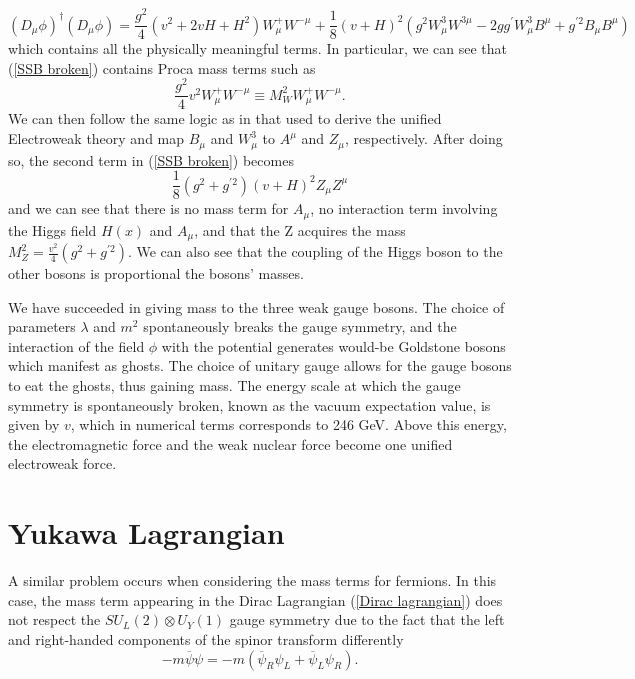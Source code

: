 \documentclass[10pt,a4paper]{book}
\begin{document}
\begin{equation}
\label{SSB broken}
(D_\mu\phi)^\dagger(D_\mu\phi) = \frac{g^2}{4}\left(v^2 + 2vH + H^2\right)W^+_\mu W^{- \mu} + \frac{1}{8}(v + H)^2 \left( g^2 W^3_\mu W^{3\mu} - 2gg^\prime W^3_\mu B^\mu + g^{\prime 2}B_\mu B^\mu \right)
\end{equation}
which contains all the physically meaningful terms. In particular, we can see that (\ref{SSB broken}) contains Proca mass terms such as 
\begin{equation}
\frac{g^2}{4}v^2 W_\mu^+ W^{-\mu} \equiv M^2_W W_\mu^+ W^{-\mu}.
\end{equation}
We can then follow the same logic as in that used to derive the unified Electroweak theory and map $B_\mu$ and $W^3_\mu$ to $A^\mu$ and $Z_\mu$, respectively. After doing so, the second term in (\ref{SSB broken}) becomes
\begin{equation}
\frac{1}{8}(g^2 + g^{\prime 2})(v + H)^2 Z_\mu Z^\mu
\end{equation}
and we can see that there is no mass term for $A_\mu$, no interaction term involving the Higgs field $H(x)$ and $A_\mu$, and that the Z acquires the mass $M^2_Z = \frac{v^2}{4}(g^2 + g^{\prime 2})$. We can also see that the coupling of the Higgs boson to the other bosons is proportional the bosons' masses. 

We have succeeded in giving mass to the three weak gauge bosons. The choice of parameters $\lambda$ and $m^2$ spontaneously breaks the gauge symmetry, and the interaction of the field $\phi$ with the potential generates would-be Goldstone bosons which manifest as ghosts. The choice of unitary gauge allows for the gauge bosons to eat the ghosts, thus gaining mass. The energy scale at which the gauge symmetry is spontaneously broken, known as the vacuum expectation value, is given by $v$, which in numerical terms corresponds to 246 GeV. Above this energy, the electromagnetic force and the weak nuclear force become one unified electroweak force. 

\section{Yukawa Lagrangian}

A similar problem occurs when considering the mass terms for fermions. In this case, the mass term appearing in the Dirac Lagrangian (\ref{Dirac lagrangian}) does not respect the $SU_L(2)\otimes U_Y(1)$ gauge symmetry due to the fact that the left and right-handed components of the spinor transform differently
\begin{equation}
-m\overline{\psi}\psi = -m\left(\overline{\psi}_R\psi_L + \overline{\psi}_L\psi_R\right).
\end{equation}
\end{document}
